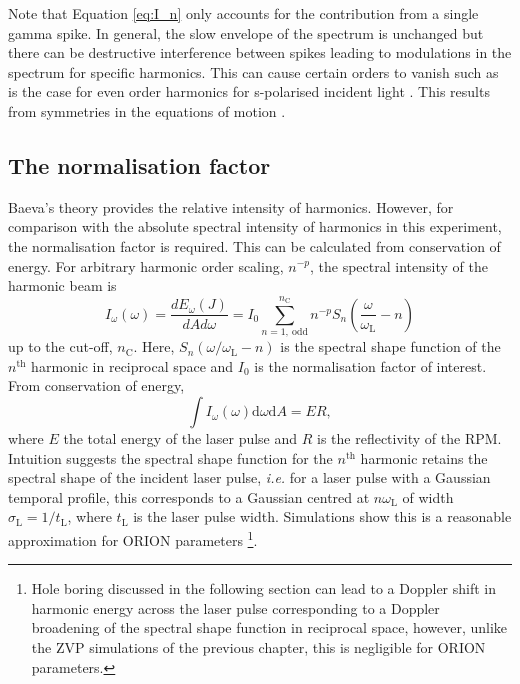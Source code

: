 Note that Equation \ref{eq:I_n} only accounts for the contribution from a single gamma spike. In general, the slow envelope of the spectrum is unchanged \cite{baevaHighHarmonicGeneration2008} but there can be destructive interference between spikes leading to modulations in the spectrum for specific harmonics. This can cause certain orders to vanish such as is the case for even order harmonics for s-polarised incident light \cite{lichtersShortpulseLaserHarmonics1996}. This results from symmetries in the equations of motion \cite{trinesLaserHarmonicGeneration2023}. 


\subsection{The normalisation factor}
Baeva's theory provides the relative intensity of harmonics. However, for comparison with the absolute spectral intensity of harmonics in this experiment, the normalisation factor is required. This can be calculated from conservation of energy. For arbitrary harmonic order scaling, $n^{-p}$, the spectral intensity of the harmonic beam is
\begin{equation}
	I_\omega(\omega) = \frac{dE_\omega(J)}{dAd\omega} = I_0 \sum^{n_\mathrm{C}}_{n = 1,\ \mathrm{odd}} n^{-p} S_n\left( \frac{\omega}{\omega_\mathrm{L}}-n\right)
\end{equation}
up to the cut-off, $n_\mathrm{C}$. Here, $S_n(\omega/\omega_\mathrm{L}-n)$ is the spectral shape function of the $n^\mathrm{th}$ harmonic in reciprocal space and $I_0$ is the normalisation factor of interest. From conservation of energy,
\begin{equation}
	\int I_\omega(\omega) \mathrm{d}\omega \mathrm{d} A = ER,
\end{equation}
where $E$ the total energy of the laser pulse and $R$ is the reflectivity of the \ac{RPM}. Intuition suggests the spectral shape function for the $n^\mathrm{th}$ harmonic retains the spectral shape of the incident laser pulse, \textit{i.e.} for a laser pulse with a Gaussian temporal profile, this corresponds to a Gaussian centred at $n\omega_\mathrm{L}$ of width $\sigma_\mathrm{L} = 1/t_\mathrm{L}$, where $t_\mathrm{L}$ is the laser pulse width. Simulations show this is a reasonable approximation for ORION parameters \footnote{Hole boring discussed in the following section can lead to a Doppler shift in harmonic energy across the laser pulse corresponding to a Doppler broadening of the spectral shape function in reciprocal space, however, unlike the ZVP simulations of the previous chapter, this is negligible for ORION parameters.}.

